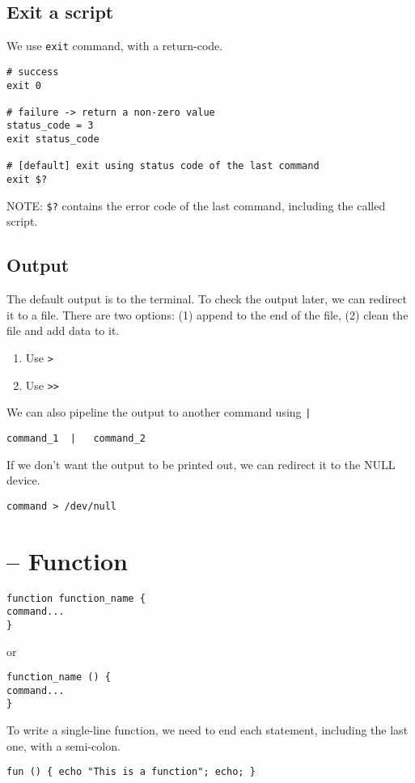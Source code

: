 \subsection{Exit a script}


We use \verb!exit! command, with a return-code.
\begin{verbatim}
# success
exit 0

# failure -> return a non-zero value
status_code = 3
exit status_code

# [default] exit using status code of the last command
exit $?
\end{verbatim}

NOTE: \verb!$?! contains the error code of the last command, including the
called script.

\subsection{Output}

The default output is to the terminal. To check the output later, we can
redirect it to a file. There are two options: (1) append to the end of the file,
(2) clean the file and add data to it. 
\begin{enumerate}
  \item Use \verb!>!
  \item Use \verb!>>!
\end{enumerate}

We can also pipeline the output to another command using \verb!|!
\begin{verbatim}
command_1  |   command_2
\end{verbatim}

If we don't want the output to be printed out, we can redirect it to the NULL
device.
\begin{verbatim}
command > /dev/null
\end{verbatim}

\section{-- Function}
\label{sec:bash_function}

\begin{verbatim}
function function_name { 
command... 
} 
\end{verbatim}
or
\begin{verbatim}
function_name () { 
command... 
} 
\end{verbatim}

To write a single-line function, we need to end each statement, including
the last one, with a semi-colon.
\begin{verbatim}
fun () { echo "This is a function"; echo; }
\end{verbatim}

